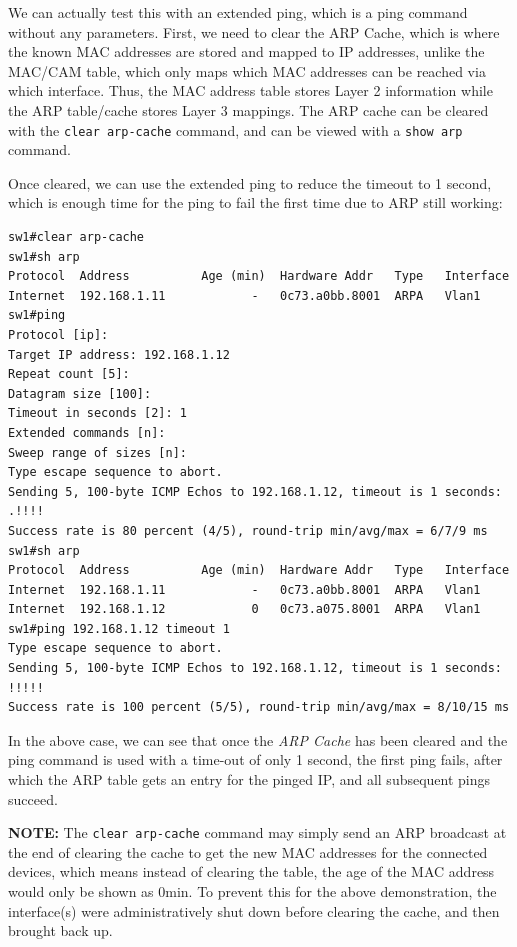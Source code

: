 We can actually test this with an extended ping, which is a ping command without any parameters. First, we need to clear the ARP Cache, which is where the known MAC addresses are stored and mapped to IP addresses, unlike the MAC/CAM table, which only maps which MAC addresses can be reached via which interface. Thus, the MAC address table stores Layer 2 information while the ARP table/cache stores Layer 3 mappings. The ARP cache can be cleared with the \verb|clear arp-cache| command, and can be viewed with a \verb|show arp| command. 

Once cleared, we can use the extended ping to reduce the timeout to 1 second, which is enough time for the ping to fail the first time due to ARP still working:

\vspace{-15pt}
\begin{verbatim}
sw1#clear arp-cache
sw1#sh arp
Protocol  Address          Age (min)  Hardware Addr   Type   Interface
Internet  192.168.1.11            -   0c73.a0bb.8001  ARPA   Vlan1
sw1#ping
Protocol [ip]:
Target IP address: 192.168.1.12
Repeat count [5]:
Datagram size [100]:
Timeout in seconds [2]: 1
Extended commands [n]:
Sweep range of sizes [n]:
Type escape sequence to abort.
Sending 5, 100-byte ICMP Echos to 192.168.1.12, timeout is 1 seconds:
.!!!!
Success rate is 80 percent (4/5), round-trip min/avg/max = 6/7/9 ms
sw1#sh arp
Protocol  Address          Age (min)  Hardware Addr   Type   Interface
Internet  192.168.1.11            -   0c73.a0bb.8001  ARPA   Vlan1
Internet  192.168.1.12            0   0c73.a075.8001  ARPA   Vlan1
sw1#ping 192.168.1.12 timeout 1
Type escape sequence to abort.
Sending 5, 100-byte ICMP Echos to 192.168.1.12, timeout is 1 seconds:
!!!!!
Success rate is 100 percent (5/5), round-trip min/avg/max = 8/10/15 ms
\end{verbatim}
\vspace{-10pt}

\noindent
In the above case, we can see that once the \textit{ARP Cache} has been cleared and the ping command is used with a time-out of only 1 second, the first ping fails, after which the ARP table gets an entry for the pinged IP, and all subsequent pings succeed. 

\noindent
\textbf{NOTE:} The \verb|clear arp-cache| command may simply send an ARP broadcast at the end of clearing the cache to get the new MAC addresses for the connected devices, which means instead of clearing the table, the age of the MAC address would only be shown as 0min. To prevent this for the above demonstration, the interface(s) were administratively shut down before clearing the cache, and then brought back up. 

